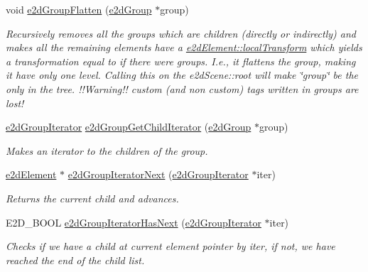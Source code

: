 \begin{DoxyCompactItemize}
void \hyperlink{group__e2d_group_gafa65ab615b8a0c181a2d5b88eed9fa16}{e2d\-Group\-Flatten} (\hyperlink{structe2d_group}{e2d\-Group} $\ast$group)
\begin{DoxyCompactList}\small\item\em Recursively removes all the groups which are children (directly or indirectly) and makes all the remaining elements have a \hyperlink{structe2d_element_a52bda732df714953f93c1e6f5f7c7c93}{e2d\-Element\-::local\-Transform} which yields a transformation equal to if there were groups. I.\-e., it flattens the group, making it have only one level. Calling this on the e2d\-Scene\-::root will make \char`\"{}group\char`\"{} be the only in the tree. !!\-Warning!! custom (and non custom) tags written in groups are lost! \end{DoxyCompactList}\item 
\hyperlink{structe2d_group_iterator}{e2d\-Group\-Iterator} \hyperlink{group__e2d_group_gaf5a7338c446192338b764a7ac89371d5}{e2d\-Group\-Get\-Child\-Iterator} (\hyperlink{structe2d_group}{e2d\-Group} $\ast$group)
\begin{DoxyCompactList}\small\item\em Makes an iterator to the children of the group. \end{DoxyCompactList}\item 
\hyperlink{structe2d_element}{e2d\-Element} $\ast$ \hyperlink{group__e2d_group_gaa5ffe3eb2b83f318df4f22272f1e1189}{e2d\-Group\-Iterator\-Next} (\hyperlink{structe2d_group_iterator}{e2d\-Group\-Iterator} $\ast$iter)
\begin{DoxyCompactList}\small\item\em Returns the current child and advances. \end{DoxyCompactList}\item 
E2\-D\-\_\-\-B\-O\-O\-L \hyperlink{group__e2d_group_ga493d54c28198410762cfa32c97d8e646}{e2d\-Group\-Iterator\-Has\-Next} (\hyperlink{structe2d_group_iterator}{e2d\-Group\-Iterator} $\ast$iter)
\begin{DoxyCompactList}\small\item\em Checks if we have a child at current element pointer by iter, if not, we have reached the end of the child list. \end{DoxyCompactList}\end{DoxyCompactItemize}


